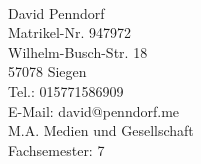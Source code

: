 \documentclass[a4paper,12pt]{scrartcl}
\begin{document}
\begin{titlepage}
\begin{center}
\end{center}
\vfill
\begin{minipage}[t]{0.66\textwidth}
\  
\end{minipage}
\begin{minipage}[t]{0.34\textwidth}
\begin{small}
\begin{flushleft}
David Penndorf \\ Matrikel-Nr. 947972 \\ Wilhelm-Busch-Str. 18 \\ 57078 Siegen \\ Tel.: 015771586909 \\ E-Mail: david@penndorf.me\\ 
M.A. Medien und Gesellschaft \\ Fachsemester: 7
\end{flushleft}
\end{small}
\end{minipage}
\end{titlepage}



\tableofcontents
\thispagestyle{empty}
\clearpage



\renewcommand{\sectionmark}[1]{\markright{#1}}
\renewcommand{\subsectionmark}[1]{}
\renewcommand{\subsubsectionmark}[1]{}
\rhead{\rightmark}

\onehalfspacing
\renewcommand{\thesection}{\arabic{section}}
\renewcommand{\thesection}{\arabic{section}}
\setcounter{section}{0}
\setcounter{page}{1}

\end{document}

